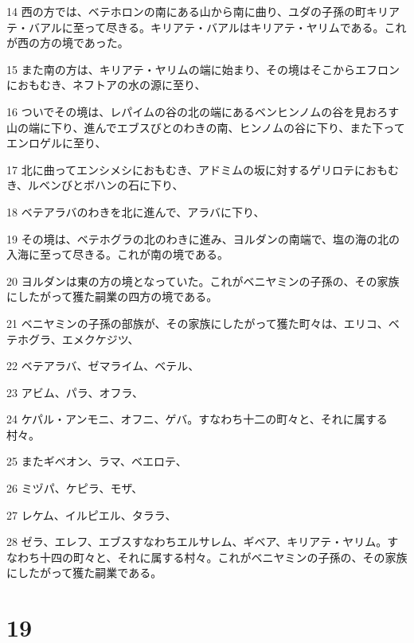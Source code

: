 \par 14 西の方では、ベテホロンの南にある山から南に曲り、ユダの子孫の町キリアテ・バアルに至って尽きる。キリアテ・バアルはキリアテ・ヤリムである。これが西の方の境であった。
\par 15 また南の方は、キリアテ・ヤリムの端に始まり、その境はそこからエフロンにおもむき、ネフトアの水の源に至り、
\par 16 ついでその境は、レパイムの谷の北の端にあるベンヒンノムの谷を見おろす山の端に下り、進んでエブスびとのわきの南、ヒンノムの谷に下り、また下ってエンロゲルに至り、
\par 17 北に曲ってエンシメシにおもむき、アドミムの坂に対するゲリロテにおもむき、ルベンびとボハンの石に下り、
\par 18 ベテアラバのわきを北に進んで、アラバに下り、
\par 19 その境は、ベテホグラの北のわきに進み、ヨルダンの南端で、塩の海の北の入海に至って尽きる。これが南の境である。
\par 20 ヨルダンは東の方の境となっていた。これがベニヤミンの子孫の、その家族にしたがって獲た嗣業の四方の境である。
\par 21 ベニヤミンの子孫の部族が、その家族にしたがって獲た町々は、エリコ、ベテホグラ、エメクケジツ、
\par 22 ベテアラバ、ゼマライム、ベテル、
\par 23 アビム、パラ、オフラ、
\par 24 ケパル・アンモニ、オフニ、ゲバ。すなわち十二の町々と、それに属する村々。
\par 25 またギベオン、ラマ、ベエロテ、
\par 26 ミヅパ、ケピラ、モザ、
\par 27 レケム、イルピエル、タララ、
\par 28 ゼラ、エレフ、エブスすなわちエルサレム、ギベア、キリアテ・ヤリム。すなわち十四の町々と、それに属する村々。これがベニヤミンの子孫の、その家族にしたがって獲た嗣業である。

\chapter{19}

